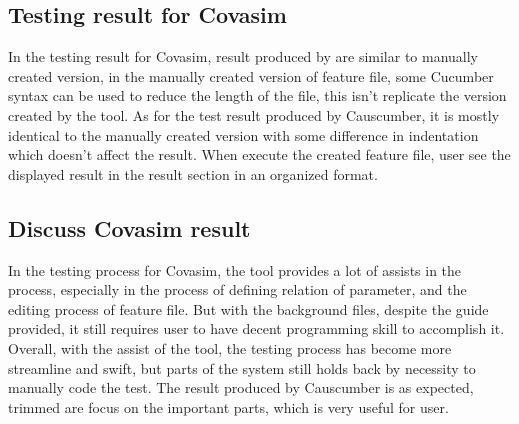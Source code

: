 \subsection{Testing result for Covasim}
In the testing result for Covasim, result produced by are similar to manually created version, in the manually created version of feature file, some Cucumber syntax can be used to reduce the length of the file, this isn’t replicate the version created by the tool. As for the test result produced by Causcumber, it is mostly identical to the manually created version with some difference in indentation which doesn’t affect the result. When execute the created feature file, user see the displayed result in the result section in an organized format.
\subsection{Discuss Covasim result}
In the testing process for Covasim, the tool provides a lot of assists in the process, especially in the process of defining relation of parameter, and the editing process of feature file. But with the background files, despite the guide provided, it still requires user to have decent programming skill to accomplish it. Overall, with the assist of the tool, the testing process has become more streamline and swift, but parts of the system still holds back by necessity to manually code the test. The result produced by Causcumber is as expected, trimmed are focus on the important parts, which is very useful for user.
